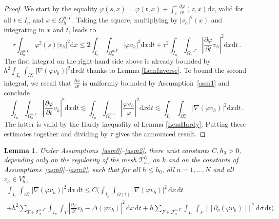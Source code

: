 \documentclass[11pt,a4paper]{article}
\theoremstyle{plain}
\newtheorem{lemma}[theorem]{Lemma}%
\theoremstyle{definition}
\theoremstyle{remark}
\numberwithin{equation}{section}
\newcommand{\dx}{\mathrm{d}x}
\newcommand{\dsigma}{\mathrm{d}\sigma}
\newcommand{\dt}{\mathrm{d}t}
\newcommand{\dz}{\mathrm{d}z}
\begin{document}
\begin{proof}
		We start by the equality $\varphi (s, x) = \varphi (t, x) + \int_{t}^s \frac{\partial \varphi}{\partial t} (z, x) \dz$, valid for all $t\in I_n$ and $x \in \Omega_h^{n, \Gamma}$. Taking the square, multiplying by $| v_h |^2 (x)$ and integrating in $x$ and $t$, leads to
		\[ \tau \int_{\Omega_h^{n, \Gamma}} \varphi^2 (s) |v_h |^2 \dx
		\leqslant 2 \int_{I_n} \int_{\Omega^{n, \Gamma}_h} | \varphi v_h |^2 \dx \dt + \tau^2 \int_{I_n} \int_{\Omega^{n, \Gamma}_h} \left|
		\frac{\partial \varphi}{\partial t} v_h \right|^2 \dx \dt \,.\]
		The first integral on the right-hand side above is already bounded by $h^2
		\int_{I_n} \int_{\Omega^n_h} | \nabla (\varphi v_h) |^2 \dx \dt$ thanks to
		Lemma \ref{LemInverse}. To bound the second integral, we recall that $\frac{\partial\varphi}{\partial t}$ is uniformly bounded by Assumption~\ref{asm1} and conclude
		\[ \int_{I_n} \int_{\Omega^{n, \Gamma}_h} \left| \frac{\partial
			\varphi}{\partial t} v_h \right|^2 \dx \dt \lesssim \int_{I_n}
		\int_{\Omega^{n, \Gamma}_h} \left|  \frac{\varphi v_h}{\varphi} \right|^2
		\dx \dt \lesssim \int_{I_n} \int_{\Omega^n_h} | \nabla (\varphi v_h) |^2
		\dx \dt \,.\]
		The latter is valid by the Hardy inequality of Lemma \ref{LemHardy}.
		Putting these estimates together and dividing by $\tau$ gives the announced
		result.
\end{proof}

\begin{lemma}
	\label{LemMag1}
	Under Assumptions~\ref{asm0}--\ref{asm2}, there exist constants $C,h_0>0$, depending only on the regularity of the mesh $\mathcal{T}_h^{\mathcal{O}}$, on $k$ and on the constants of Assumptions~\ref{asm0}--\ref{asm2}, such that for all $h\leqslant h_0$, all $n=1,\ldots,N$ and all $v_h \in V_h^n$,
	\begin{multline*}
		\int_{I_n} \int_{\Omega_h^n} | \nabla (\varphi v_h) |^2 \, \dx \, \dt
		\leq C \Bigg(
		\int_{I_n} \int_{\Omega(t)} | \nabla (\varphi v_h) |^2 \, \dx \, \dt \\
		+ h^2 \sum_{T\in\mathcal{T}_h^{n,\Gamma}}\int_{I_n} \int_{T}
		\left| \frac{\partial \varphi}{\partial t} v_h - \Delta (\varphi v_h) \right|^2 \, \dx \, \dt
		+ h \sum_{F\in\mathcal{F}_h^{n, \Gamma}} \int_{I_n}  \int_{F}	 [\![\partial_\nu (\varphi v_h)]\!] ^2 \, \dsigma \, \dt
		\Bigg).
	\end{multline*}
\end{lemma}
\end{document}
